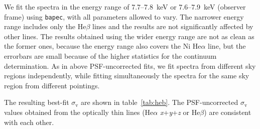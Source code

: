 We fit the spectra in the energy range of 7.7--7.8~keV or 7.6--7.9~keV (observer frame) using \verb+bapec+, with all parameters allowed to vary. The narrower energy range includes only the He$\beta$ lines and the results are not significantly affected by other lines. The results obtained using the wider energy range are not as clean as the former ones, because the energy range also covers the Ni He$\alpha$ line, but the errorbars are small because of the higher statistics for the continuum determination. As in above PSF-uncorrected fits, we fit spectra from different sky regions independently, while fitting simultaneously the spectra for the same sky region from different pointings.

\begin{table*}
 \label{tab:heb}
\end{table*}

The resulting best-fit $\sigma_\mathrm{v}$ are shown in table~\ref{tab:heb}. The PSF-uncorrected $\sigma_\mathrm{v}$ values obtained from the optically thin lines (He$\alpha$ {\it x}+{\it y}+{\it z} or He$\beta$) are consistent with each other.
